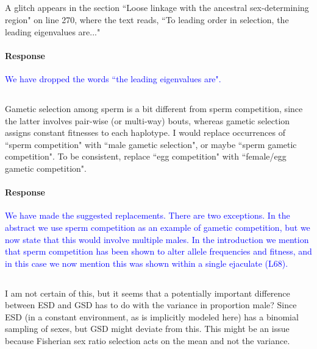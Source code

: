 \documentclass[10pt,letterpaper]{article}
\begin{document}
\noindent\subsection{}
A glitch appears in the section ``Loose linkage with the ancestral sex-determining region" on line 270, where the text reads, ``To leading order in selection, the leading eigenvalues are..."

\noindent\paragraph{Response}
\textcolor{blue}{We have dropped the words ``the leading eigenvalues are".}

\noindent\subsection{}
Gametic selection among sperm is a bit different from sperm competition, since the latter involves pair-wise (or multi-way) bouts, whereas gametic selection assigns constant fitnesses to each haplotype. I would replace occurrences of ``sperm competition" with ``male gametic selection", or maybe ``sperm gametic competition". To be consistent, replace ``egg competition" with ``female/egg gametic competition". 

\noindent\paragraph{Response}
\textcolor{blue}{We have made the suggested replacements. There are two exceptions. In the abstract we use sperm competition as an example of gametic competition, but we now state that this would involve multiple males. In the introduction we mention that sperm competition has been shown to alter allele frequencies and fitness, and in this case we now mention this was shown within a single ejaculate (L68).}

\noindent\subsection{}
I am not certain of this, but it seems that a potentially important difference between ESD and GSD has to do with the variance in proportion male? Since ESD (in a constant environment, as is implicitly modeled here) has a binomial sampling of sexes, but GSD might deviate from this.  This might be an issue because Fisherian sex ratio selection acts on the mean and not the variance.
\end{document}
